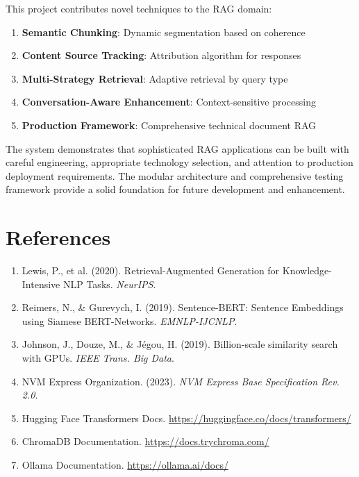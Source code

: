 \documentclass[10pt,a4paper,twocolumn]{article}
\begin{document}
This project contributes novel techniques to the RAG domain:

\begin{enumerate}[leftmargin=1.5em]
    \item \textbf{Semantic Chunking}: Dynamic segmentation based on coherence
    \item \textbf{Content Source Tracking}: Attribution algorithm for responses
    \item \textbf{Multi-Strategy Retrieval}: Adaptive retrieval by query type
    \item \textbf{Conversation-Aware Enhancement}: Context-sensitive processing
    \item \textbf{Production Framework}: Comprehensive technical document RAG
\end{enumerate}

The system demonstrates that sophisticated RAG applications can be built with careful engineering, appropriate technology selection, and attention to production deployment requirements. The modular architecture and comprehensive testing framework provide a solid foundation for future development and enhancement.

\section{References}

\begin{enumerate}[leftmargin=1.5em]
    \item Lewis, P., et al. (2020). Retrieval-Augmented Generation for Knowledge-Intensive NLP Tasks. \textit{NeurIPS}.
    \item Reimers, N., \& Gurevych, I. (2019). Sentence-BERT: Sentence Embeddings using Siamese BERT-Networks. \textit{EMNLP-IJCNLP}.
    \item Johnson, J., Douze, M., \& Jégou, H. (2019). Billion-scale similarity search with GPUs. \textit{IEEE Trans. Big Data}.
    \item NVM Express Organization. (2023). \textit{NVM Express Base Specification Rev. 2.0}.
    \item Hugging Face Transformers Docs. \url{https://huggingface.co/docs/transformers/}
    \item ChromaDB Documentation. \url{https://docs.trychroma.com/}
    \item Ollama Documentation. \url{https://ollama.ai/docs/}
\end{enumerate}

\balance
\end{document}
